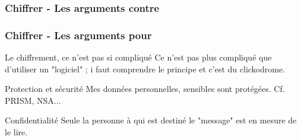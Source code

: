 \begin{frame}
\frametitle{Chiffrer - Les arguments contre}

\end{frame}

\begin{frame}
\frametitle{Chiffrer - Les arguments pour}

\begin{block}{Le chiffrement, ce n'est pas si compliqué}
Ce n'est pas plus compliqué que d'utiliser un "logiciel" ; i faut comprendre le principe et c'est du clickodrome.
\end{block}

\begin{block}{Protection et sécurité}
Mes données personnelles, sensibles sont protégées. Cf. PRISM, NSA...
\end{block}

\begin{block}{Confidentialité}
Seule la personne à qui est destiné le "message" est en mesure de le lire.
\end{block}

\end{frame}

